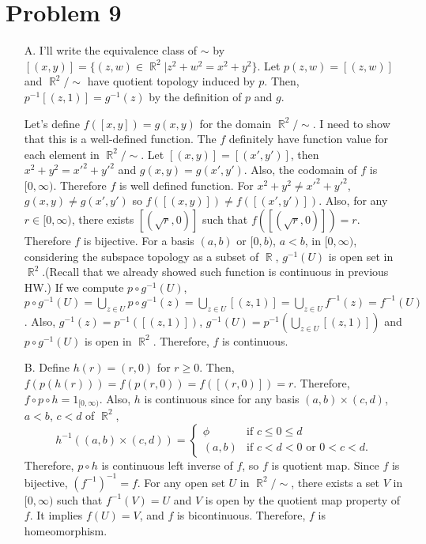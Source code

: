 \documentclass{article}
\DeclareMathOperator{\rr}{\mathbb{R}}
\begin{document}
\section*{Problem 9}
\begin{enumerate}
\item[A.] I'll write the equivalence class of $\sim$ by $[(x,y)]=\{(z,w)\in \rr^2|z^2+w^2=x^2+y^2\}$. Let $p(z,w)=[(z,w)]$ and $\rr^2/\sim$ have quotient topology induced by $p$. Then, $p^{-1}[(z,1)]=g^{-1}(z)$ by the definition of $p$ and $g$. 

Let's define $f([x,y])=g(x,y)$ for the domain $\rr^2/\sim$. I need to show that this is a well-defined function. The $f$ definitely have function value for each element in $\rr^2/\sim$. Let $[(x,y)]=[(x',y')]$, then $x^2+y^2=x'^2+y'^2$ and $g(x,y)=g(x', y')$. Also, the codomain of $f$ is $[0,\infty)$. Therefore $f$ is well defined function. For $x^2+y^2\neq x'^2+y'^2$, $g(x,y)\neq g(x', y')$ so $f([(x,y)])\neq f([(x',y')])$. Also, for any $r\in [0, \infty)$, there exists $[(\sqrt{r}, 0)]$ such that $f([(\sqrt{r}, 0)])=r$. Therefore $f$ is bijective. For a basis $(a,b)$ or $[0, b)$, $a<b$, in $[0, \infty)$, considering the subspace topology as a subset of $\rr$, $g^{-1}(U)$ is open set in $\rr^2$.(Recall that we already showed such function is continuous in previous HW.) If we compute $p\circ g^{-1}(U)$, $p\circ g^{-1}(U)=\bigcup_{z\in U}p\circ g^{-1}(z)=\bigcup_{z\in U}[(z,1)]=\bigcup_{z\in U} f^{-1}(z)=f^{-1}(U)$. Also, $g^{-1}(z)=p^{-1}([(z,1)])$, $g^{-1}(U)=p^{-1}\left(\bigcup_{z\in U} [(z,1)]\right)$ and $p\circ g^{-1}(U)$ is open in $\rr^2$. Therefore, $f$ is continuous.

\item[B.] Define $h(r)=(r, 0)$ for $r\geq 0$. Then, $f(p(h(r)))=f(p(r, 0))=f([(r,0)])=r$. Therefore, $f\circ p \circ h=1_{[0,\infty)}$. Also, $h$ is continuous since for any basis $(a,b)\times (c,d)$, $a<b$, $c<d$ of $\rr^2$,
\begin{equation*}
h^{-1}\left((a,b)\times (c,d)\right)=\begin{cases}
\phi & \text{if }c\leq 0\leq d \\
(a,b) & \text{if } c<d<0 \text{ or }0<c<d.
\end{cases}
\end{equation*}
Therefore, $p\circ h$ is continuous left inverse of $f$, so $f$ is quotient map. Since $f$ is bijective, $\left(f^{-1}\right)^{-1}=f$. For any open set $U$ in $\rr^2/\sim$, there exists a set $V$ in $[0,\infty)$ such that $f^{-1}(V)=U$ and $V$ is open by the quotient map property of $f$. It implies $f(U)=V$, and $f$ is bicontinuous. Therefore, $f$ is homeomorphism.
\end{enumerate}
\end{document}
